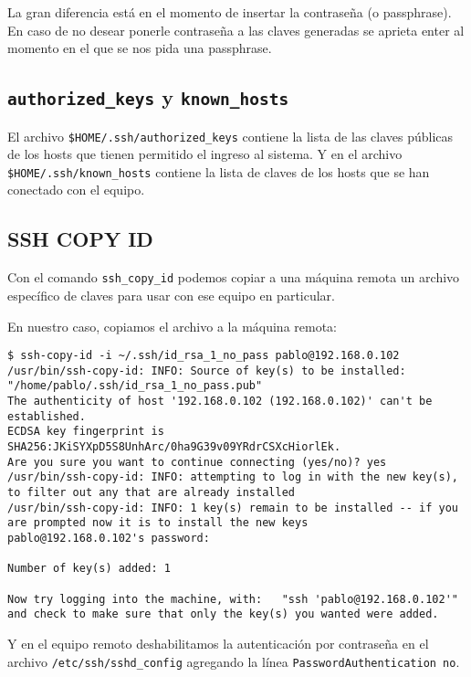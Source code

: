 La gran diferencia está en el momento de insertar la contraseña (o passphrase). En caso de no desear ponerle contraseña a las claves generadas se aprieta enter al momento en el que se nos pida una passphrase.

\subsection*{\texttt{authorized\_keys} y \texttt{known\_hosts}}

El archivo \texttt{\$HOME/.ssh/authorized\_keys} contiene la lista de las claves públicas de los hosts que tienen permitido el ingreso al sistema. Y en el archivo \texttt{\$HOME/.ssh/known\_hosts} contiene la lista de claves de los hosts que se han conectado con el equipo. 

\subsection*{SSH COPY ID}

Con el comando \texttt{ssh\_copy\_id} podemos copiar a una máquina remota un archivo específico de claves para usar con ese equipo en particular.

En nuestro caso, copiamos el archivo a la máquina remota:

\begin{lstlisting}[breaklines=true]
$ ssh-copy-id -i ~/.ssh/id_rsa_1_no_pass pablo@192.168.0.102
/usr/bin/ssh-copy-id: INFO: Source of key(s) to be installed: "/home/pablo/.ssh/id_rsa_1_no_pass.pub"
The authenticity of host '192.168.0.102 (192.168.0.102)' can't be established.
ECDSA key fingerprint is SHA256:JKiSYXpD5S8UnhArc/0ha9G39v09YRdrCSXcHiorlEk.
Are you sure you want to continue connecting (yes/no)? yes
/usr/bin/ssh-copy-id: INFO: attempting to log in with the new key(s), to filter out any that are already installed
/usr/bin/ssh-copy-id: INFO: 1 key(s) remain to be installed -- if you are prompted now it is to install the new keys
pablo@192.168.0.102's password:

Number of key(s) added: 1

Now try logging into the machine, with:   "ssh 'pablo@192.168.0.102'"
and check to make sure that only the key(s) you wanted were added.
\end{lstlisting}

Y en el equipo remoto deshabilitamos la autenticación por contraseña en el archivo \texttt{/etc/ssh/sshd\_config} agregando la línea \texttt{PasswordAuthentication no}.

